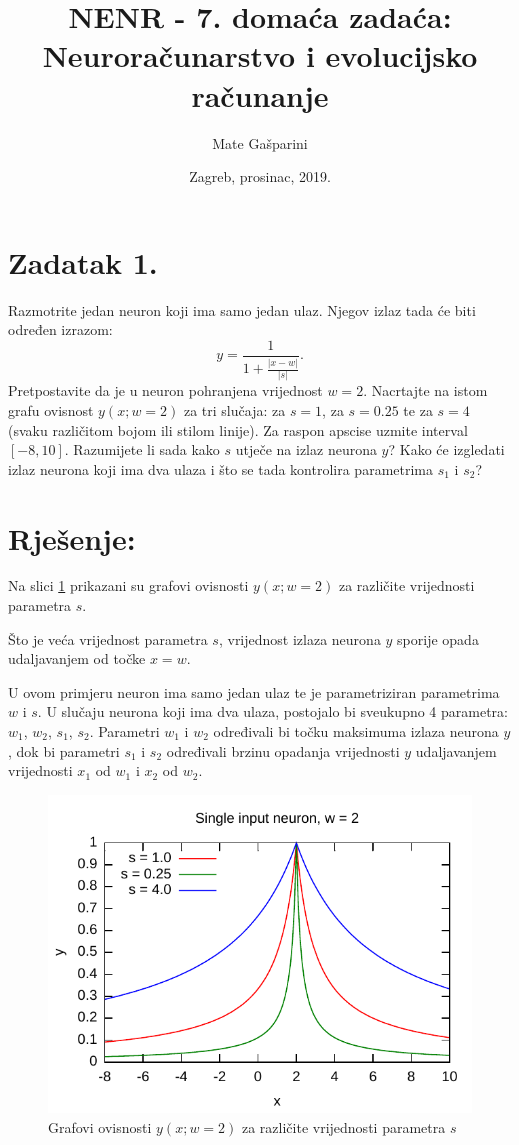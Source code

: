 \documentclass{article}
\title{NENR - 7. domaća zadaća: Neuroračunarstvo i
evolucijsko računanje}
\author{Mate Gašparini}
\date{Zagreb, prosinac, 2019.}
\begin{document}
\maketitle

\section*{Zadatak 1.}
Razmotrite jedan neuron koji ima samo jedan ulaz. Njegov izlaz
tada će biti određen izrazom:
\begin{equation*}
    y = \frac{1}{1 + \frac{|x-w|}{|s|}}.
\end{equation*}
Pretpostavite da je u neuron pohranjena vrijednost $ w = 2 $.
Nacrtajte na istom grafu ovisnost $ y(x; w = 2) $ za tri
slučaja: za $ s = 1 $, za $ s = 0.25 $ te za $ s = 4 $ (svaku
različitom bojom ili stilom linije). Za raspon apscise uzmite
interval $ [-8, 10] $. Razumijete li sada kako $ s $ utječe
na izlaz neurona $ y $? Kako će izgledati izlaz neurona koji
ima dva ulaza i što se tada kontrolira parametrima $ s_1 $ i
$ s_2 $?

\section*{Rješenje:}
Na slici \ref{z1-1} prikazani su grafovi ovisnosti
$ y(x; w = 2) $ za različite vrijednosti parametra $ s $.

Što je veća vrijednost parametra $ s $, vrijednost izlaza
neurona $ y $ sporije opada udaljavanjem od točke $ x = w $.

U ovom primjeru neuron ima samo jedan ulaz te je
parametriziran parametrima $ w $ i $ s $. U slučaju neurona
koji ima dva ulaza, postojalo bi sveukupno 4 parametra:
$ w_1 $, $ w_2 $, $ s_1 $, $ s_2$. Parametri $ w_1 $ i
$ w_2 $ određivali bi točku maksimuma izlaza neurona $ y $,
dok bi parametri $ s_1 $ i $ s_2 $ određivali brzinu opadanja
vrijednosti $ y $ udaljavanjem vrijednosti $ x_1 $ od $ w_1 $
i $ x_2 $ od $ w_2 $.

\begin{figure}
    \centering
    \includegraphics{img/task1-plot.pdf}
    \caption{Grafovi ovisnosti $ y(x; w = 2) $
    za različite vrijednosti parametra $ s $}
    \label{z1-1}
\end{figure}
\end{document}
